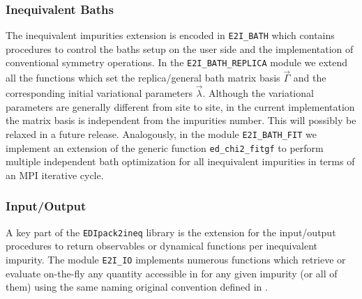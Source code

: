 \documentclass[edipack2.tex]{subfiles}
\begin{document}
\subsubsection{Inequivalent Baths}\label{ssSecIneqBath}
The inequivalent impurities extension is encoded in {\tt E2I\_BATH}
which contains procedures to control the baths setup on the user side
and the  implementation of conventional symmetry operations.
In the {\tt E2I\_BATH\_REPLICA} module we extend all the functions
which set the replica/general bath matrix basis 
$\vec{\Gamma}$ and the corresponding initial variational parameters
$\vec{\lambda}$. Although the variational parameters are generally
different from site to site, in the current implementation the matrix
basis is independent from the impurities number. This will possibly be
relaxed in a future release. 
Analogously, in the module {\tt E2I\_BATH\_FIT} we implement an extension of the generic
function {\tt ed\_chi2\_fitgf} to perform multiple independent
bath optimization for all inequivalent impurities in terms of an MPI iterative cycle. 
 
\subsubsection{Input/Output}\label{ssSecIneqIO}
A key part of the {\tt EDIpack2ineq} library is the extension for the
input/output procedures to return observables or dynamical functions per inequivalent impurity.
The module {\tt E2I\_IO} implements numerous functions which retrieve
or evaluate on-the-fly any quantity accessible in \NAME for any given
impurity (or all of them) using the same naming original convention
defined in \NAME.       
\end{document}
